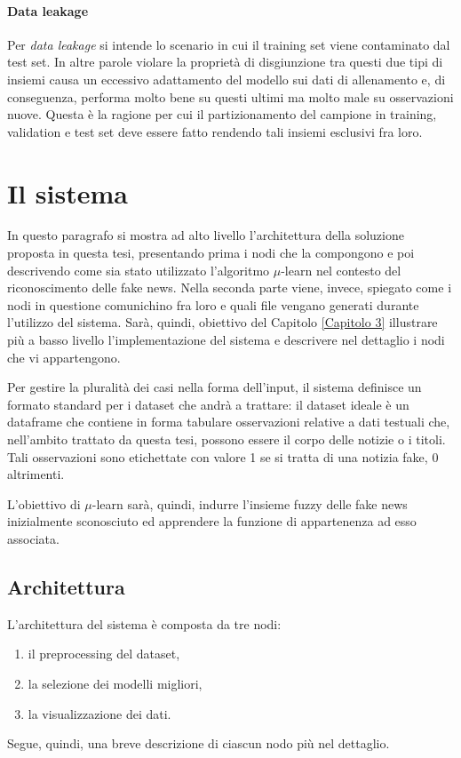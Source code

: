 \documentclass[12pt]{report}
\theoremstyle{definition}
\begin{document}
\paragraph{Data leakage} Per \textit{data leakage} si intende lo scenario in cui il training set viene contaminato dal test set. In altre parole violare la proprietà di disgiunzione tra questi due tipi di insiemi causa un eccessivo adattamento del modello sui dati di allenamento e, di conseguenza, performa molto bene su questi ultimi ma molto male su osservazioni nuove.
Questa è la ragione per cui il partizionamento del campione in training, validation e test set deve essere fatto rendendo tali insiemi esclusivi fra loro.

\section{Il sistema}
\label{sistema}
In questo paragrafo si mostra ad alto livello l'architettura della soluzione proposta in questa tesi, presentando prima i nodi che la compongono e poi descrivendo come sia stato utilizzato l'algoritmo $\mu$-learn nel contesto del riconoscimento delle fake news.
Nella seconda parte viene, invece, spiegato come i nodi in questione comunichino fra loro e quali file vengano generati durante l'utilizzo del sistema. Sarà, quindi, obiettivo del Capitolo \ref{Capitolo 3} illustrare più a basso livello l'implementazione del sistema e descrivere nel dettaglio i nodi che vi appartengono.

Per gestire la pluralità dei casi nella forma dell'input, il sistema definisce un formato standard per i dataset che andrà a trattare: il dataset ideale è un dataframe che contiene in forma tabulare osservazioni relative a dati testuali che, nell'ambito trattato da questa tesi, possono essere il corpo delle notizie o i titoli.
Tali osservazioni sono etichettate con valore 1 se si tratta di una notizia fake, 0 altrimenti.

L'obiettivo di $\mu$-learn sarà, quindi, indurre l'insieme fuzzy delle fake news inizialmente sconosciuto ed apprendere la funzione di appartenenza ad esso associata.
\subsection{Architettura}\label{architecture}
L'architettura del sistema è composta da tre nodi: 
\begin{enumerate}
    \item il preprocessing del dataset,
    \item la selezione dei modelli migliori,
    \item la visualizzazione dei dati.
\end{enumerate}
Segue, quindi, una breve descrizione di ciascun nodo più nel dettaglio.
\end{document}

